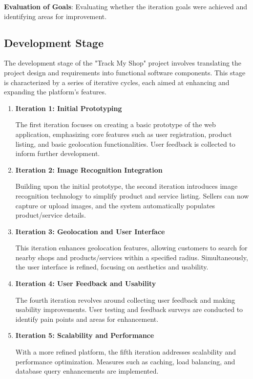 \textbf{Evaluation of Goals}:
Evaluating whether the iteration goals were achieved and identifying areas for improvement.

\pagebreak

\subsection{Development Stage}

The development stage of the "Track My Shop" project involves translating the project design and requirements into functional software components. This stage is characterized by a series of iterative cycles, each aimed at enhancing and expanding the platform's features.

\begin{enumerate}
	\item \textbf{Iteration 1: Initial Prototyping}
	
	The first iteration focuses on creating a basic prototype of the web application, emphasizing core features such as user registration, product listing, and basic geolocation functionalities. User feedback is collected to inform further development.
	
	\item \textbf{Iteration 2: Image Recognition Integration}
	
	Building upon the initial prototype, the second iteration introduces image recognition technology to simplify product and service listing. Sellers can now capture or upload images, and the system automatically populates product/service details.
	
	\item \textbf{Iteration 3: Geolocation and User Interface}
	
	This iteration enhances geolocation features, allowing customers to search for nearby shops and products/services within a specified radius. Simultaneously, the user interface is refined, focusing on aesthetics and usability.
	
	\item \textbf{Iteration 4: User Feedback and Usability}
	
	The fourth iteration revolves around collecting user feedback and making usability improvements. User testing and feedback surveys are conducted to identify pain points and areas for enhancement.
	
	\item \textbf{Iteration 5: Scalability and Performance}
	
	With a more refined platform, the fifth iteration addresses scalability and performance optimization. Measures such as caching, load balancing, and database query enhancements are implemented.
	

\end{enumerate}
